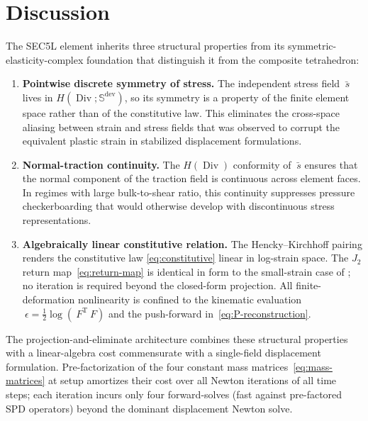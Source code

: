 \documentclass[12pt]{article}
\newcommand{\F}{~F}
\newcommand{\eps}{~\epsilon}
\newcommand{\sbar}{\bar{~s}}
\newcommand{\supdev}{^{\mathrm{dev}}}
\newcommand{\Symsd}{\mathbb{S}\supdev}
\DeclareMathOperator{\Div}{Div}
\newcommand{\transpose}[1]{{#1}^{\mathrm{T}}}
\begin{document}
\section{Discussion}
\label{sec:discussion}

The SEC5L element inherits three structural properties from its
symmetric-elasticity-complex foundation that distinguish it from the
composite tetrahedron:
\begin{enumerate}
  \item \textbf{Pointwise discrete symmetry of stress.} The
    independent stress field $\sbar$ lives in
    $H(\Div; \Symsd)$, so its symmetry is a property of the finite
    element space rather than of the constitutive law. This
    eliminates the cross-space aliasing between strain and stress
    fields that was observed to corrupt the equivalent plastic
    strain in stabilized displacement formulations.
  \item \textbf{Normal-traction continuity.} The $H(\Div)$
    conformity of $\sbar$ ensures that the normal component of
    the traction field is continuous across element faces. In
    regimes with large bulk-to-shear ratio, this continuity
    suppresses pressure checkerboarding that would otherwise
    develop with discontinuous stress representations.
  \item \textbf{Algebraically linear constitutive relation.} The
    Hencky--Kirchhoff pairing renders the constitutive law
    \eqref{eq:constitutive} linear in log-strain space. The
    $J_2$ return map~\eqref{eq:return-map} is identical in form to
    the small-strain case of \citet{Simo:1992}; no iteration is
    required beyond the closed-form projection. All
    finite-deformation nonlinearity is confined to the kinematic
    evaluation $\eps = \tfrac{1}{2}\log(\transpose{\F}\F)$ and the
    push-forward in~\eqref{eq:P-reconstruction}.
\end{enumerate}
The projection-and-eliminate architecture combines these structural
properties with a linear-algebra cost commensurate with a
single-field displacement formulation. Pre-factorization of the
four constant mass matrices~\eqref{eq:mass-matrices} at setup
amortizes their cost over all Newton iterations of all time steps;
each iteration incurs only four forward-solves (fast against
pre-factored SPD operators) beyond the dominant displacement Newton
solve.
\end{document}
